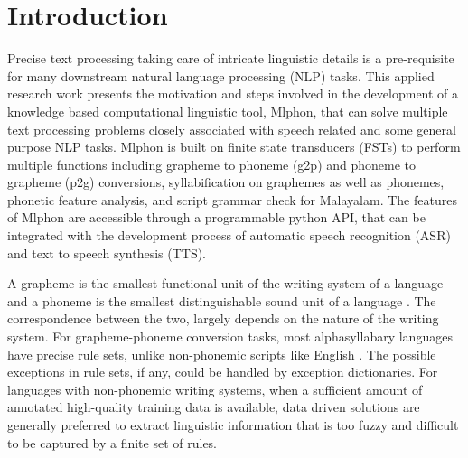 \documentclass{ieeeaccess}
\begin{document}
\section{Introduction}

\label{intro}

Precise text processing taking care of intricate linguistic details is a pre-requisite for many downstream natural language processing (NLP) tasks. This applied research work presents the motivation and steps involved in the  development of a knowledge based computational linguistic tool, Mlphon, that can solve multiple text processing problems closely associated with speech related and some general purpose NLP tasks. Mlphon is built on finite state transducers (FSTs) to perform multiple functions including grapheme to phoneme (g2p) and phoneme to grapheme (p2g) conversions, syllabification on graphemes as well as phonemes, phonetic feature analysis, and script grammar check for Malayalam. The features of Mlphon are accessible through a programmable python API, that can be integrated with the development process of automatic speech recognition (ASR) and text to speech synthesis (TTS).

A grapheme is the smallest functional unit of the writing system of a language and a phoneme is the smallest distinguishable sound unit of a language  \cite{Cocoulmas1999blackwellhen07,crystal2011dictionary}. The correspondence between the two, largely depends on the nature of the writing system. For grapheme-phoneme conversion tasks, most alphasyllabary languages have precise rule sets, unlike non-phonemic scripts like English \cite{mortensen2018epitran,baby2016unified}. The possible exceptions in rule sets, if any, could be handled by exception dictionaries. For languages with non-phonemic writing systems, when a sufficient amount of annotated high-quality training data is available, data driven solutions are generally preferred to extract linguistic information that is too fuzzy and difficult to be captured by a finite set of rules.
\end{document}
